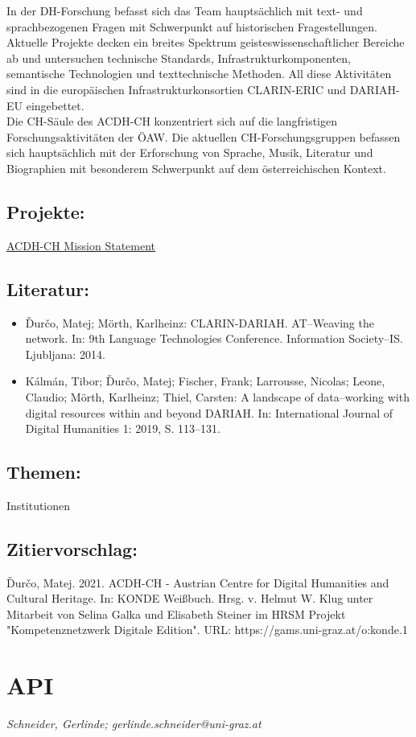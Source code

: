 \documentclass{article}
\begin{document}
        In der DH-Forschung befasst sich das Team hauptsächlich mit text- und sprachbezogenen Fragen mit Schwerpunkt auf historischen Fragestellungen. Aktuelle Projekte decken ein breites Spektrum geisteswissenschaftlicher Bereiche ab und untersuchen technische Standards, Infrastrukturkomponenten, semantische Technologien und texttechnische Methoden. All diese Aktivitäten sind in die europäischen Infrastrukturkonsortien CLARIN-ERIC und DARIAH-EU eingebettet.\\
            
        Die CH-Säule des ACDH-CH konzentriert sich auf die langfristigen Forschungsaktivitäten der ÖAW. Die aktuellen CH-Forschungsgruppen befassen sich hauptsächlich mit der Erforschung von Sprache, Musik, Literatur und Biographien mit besonderem Schwerpunkt auf dem österreichischen Kontext.\\
            
        \subsection*{Projekte:}\href{https://www.oeaw.ac.at/de/acdh/about-acdh-ch/mission/}{ACDH-CH Mission Statement}\subsection*{Literatur:}\begin{itemize}\item Ďurčo, Matej; Mörth, Karlheinz: CLARIN-DARIAH. AT–Weaving the network. In: 9th Language Technologies Conference. Information Society–IS. Ljubljana: 2014.\item Kálmán, Tibor; Ďurčo, Matej; Fischer, Frank; Larrousse, Nicolas; Leone, Claudio; Mörth, Karlheinz; Thiel, Carsten: A landscape of data–working with digital resources within and beyond DARIAH. In: International Journal of Digital Humanities 1: 2019, S. 113–131.\end{itemize}\subsection*{Themen:}Institutionen\subsection*{Zitiervorschlag:}Ďurčo, Matej. 2021. ACDH-CH - Austrian Centre for Digital Humanities and Cultural Heritage. In: KONDE Weißbuch. Hrsg. v. Helmut W. Klug unter Mitarbeit von Selina Galka und Elisabeth Steiner im HRSM Projekt "Kompetenznetzwerk Digitale Edition". URL: https://gams.uni-graz.at/o:konde.1\newpage\section*{API} \emph{Schneider, Gerlinde; gerlinde.schneider@uni-graz.at}\\
        
\end{document}
